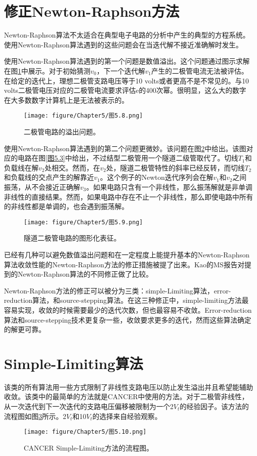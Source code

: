 \section{修正Newton-Raphson方法}
Newton-Raphson算法不太适合在典型电子电路的分析中产生的典型的方程系统。使用Newton-Raphson算法遇到的这些问题会在当迭代解不接近准确解时发生。

使用Newton-Raphson算法遇到的第一个问题是数值溢出。这个问题通过图示求解在图\ref{图5.8}中展示。对于初始猜测$v_0$，下一个迭代解$v_1$产生的二极管电流无法被评估。在给定的迭代上，理想二极管支路电压等于10 volts或者更高不是不常见的。与10 volts二极管电压对应的二极管电流要求评估e的400次幂。很明显，这么大的数字在大多数数字计算机上是无法被表示的。
\begin{figure}[htbp]
\small
    \centering
    \texttt{[image: figure/Chapter5/图5.8.png]}
    \caption{二极管电路的溢出问题。}
    \label{图5.8}
\end{figure}

使用Newton-Raphson算法遇到的第二个问题更微妙。该问题在图\ref{图5.9}中给出。该图对应的电路在图\ref{图5.3}中给出，不过结型二极管用一个隧道二级管取代了。切线$T_1$和负载线在解$v_2$处相交。然而，在$v_2$处，隧道二极管特性的斜率已经反转，而切线$T_2$和负载线的交点产生的解靠近$v_1$。这个例子的Newton迭代序列会在解$v_1$和$v_2$之间振荡，从不会接近正确解$v_3$。如果电路只含有一个非线性，那么振荡解就是非单调非线性的直接结果。然而，如果电路中存在不止一个非线性，那么即使电路中所有的非线性都是单调的，也会遇到振荡解。
\begin{figure}[htbp]
\small
    \centering
    \texttt{[image: figure/Chapter5/图5.9.png]}
    \caption{隧道二极管电路的图形化表征。}
    \label{图5.9}
\end{figure}

已经有几种可以避免数值溢出问题和在一定程度上能提升基本的Newton-Raphson算法收敛性能的Newton-Raphson方法的修正措施被提了出来。Kao\cite{ref-50}的MS报告对提到的Newton-Raphson算法的不同修正做了比较。

Newton-Raphson方法的修正可以被分为三类：simple-Limiting算法，error-reduction算法，和source-stepping算法。在这三种修正中，simple-limiting方法最容易实现，收敛的时候需要最少的迭代次数，但也最容易不收敛。Error-reduction算法和source-stepping技术更复杂一些，收敛要求更多的迭代，然而这些算法确定的解更可靠。

\section{Simple-Limiting算法}
该类的所有算法用一些方式限制了非线性支路电压以防止发生溢出并且希望能辅助收敛。该类中的最简单的方法就是CANCER\cite{ref-2}中使用的方法。对于二极管非线性，从一次迭代到下一次迭代的支路电压偏移被限制为一个2$V_t$的经验因子。该方法的流程图如图\ref{图5.10}所示。2$V_t$和10$V_t$的选择来自经验观察。
\begin{figure}[htbp]
\small
    \centering
    \texttt{[image: figure/Chapter5/图5.10.png]}
    \caption{CANCER Simple-Limiting方法的流程图。}
    \label{图5.10}
\end{figure}

